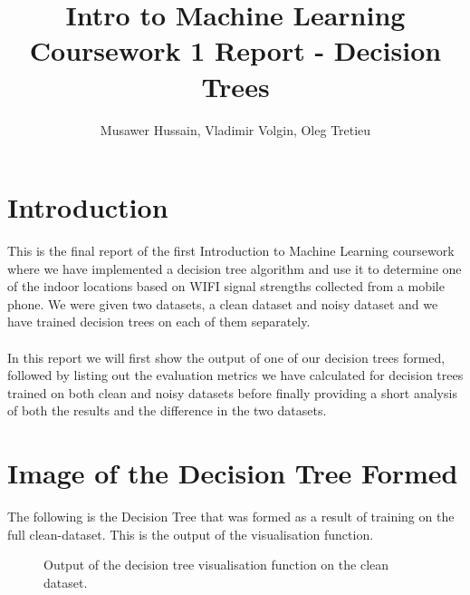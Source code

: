 \documentclass[a4paper, 11pt]{article}
\begin{document}
\title{Intro to Machine Learning Coursework 1 Report - Decision Trees}

\author{Musawer Hussain, Vladimir Volgin, Oleg Tretieu}

\maketitle

\section{Introduction}
This is the final report of the first Introduction to Machine Learning coursework where we have implemented a decision tree algorithm and use it to determine one of the indoor locations based on WIFI signal strengths collected from a mobile phone. We were given two datasets, a clean dataset and noisy dataset and we have trained decision trees on each of them separately.
\\ \\
In this report we will first show the output of one of our decision trees formed, followed by listing out the evaluation metrics we have calculated for decision trees trained on both clean and noisy datasets before finally providing a short analysis of both the results and the difference in the two datasets.

\section{Image of the Decision Tree Formed}

The following is the Decision Tree that was formed as a result of training on the full clean-dataset. This is the output of the visualisation function.

\begin{figure}[h]
  \centering
  \caption{Output of the decision tree visualisation function on the clean dataset.}
\end{figure}
\end{document}
